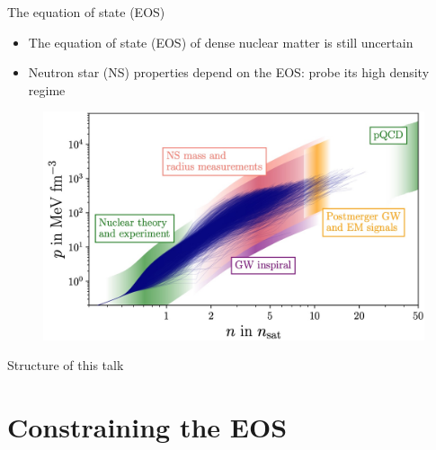 \documentclass[usenames,dvipsnames,t]{beamer}
\begin{document}
\begin{frame}{The equation of state (EOS)}
  \def\x{2mm}
  \def\y{2mm}

  \begin{itemize}
    \item The equation of state (EOS) of dense nuclear matter is still uncertain~\cite{Koehn:2024set}

    \vspace{\x}

    \item Neutron star (NS) properties depend on the EOS: probe its high density regime
  \end{itemize}

  \vspace{\x}

  \begin{figure}
    \centering
    \includegraphics[width=0.75\linewidth]{Figures/Koehn_EOS.jpg} 
  \end{figure}
\end{frame}

\begin{frame}{Structure of this talk}
  
\end{frame}

\section{Constraining the EOS}
\end{document}
